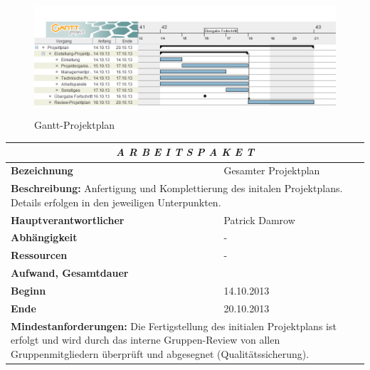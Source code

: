 \documentclass[fontsize=12pt,paper=a4,twoside]{scrartcl}
\begin{document}
\begin{figure}[htbp]
\caption{Gantt-Projektplan}
\includegraphics[scale=0.56]{Gantt-Projektplan.png}
\newline
\label{Gantt-Projektplan}
\end{figure}


\begin{tabular}{p{7.5cm}|p{7.5cm}}\toprule
\multicolumn{2}{c}{\textbf{\textit{A R B E I T S P A K E T \quad 1}}} \\ \toprule \hline
\textbf{Bezeichnung} & Gesamter Projektplan\\\hline
\multicolumn{2}{p{15cm}}{\textbf{Beschreibung:} \newline 
Anfertigung und Komplettierung des initalen Projektplans. Details erfolgen in den jeweiligen Unterpunkten.}  \\\hline
\textbf{Hauptverantwortlicher} & Patrick Damrow\\\hline
\textbf{Abhängigkeit} & -\\\hline
\textbf{Ressourcen} & -\\\hline
\textbf{Aufwand, Gesamtdauer} & \\\hline
\textbf{Beginn} & 14.10.2013 \\\hline
\textbf{Ende} & 20.10.2013\\\hline
\multicolumn{2}{p{15cm}}{\textbf{Mindestanforderungen: } \newline
Die Fertigstellung des initialen Projektplans ist erfolgt und wird durch das interne Gruppen-Review von allen Gruppenmitgliedern überprüft und abgesegnet (Qualitätssicherung).}  \\ \toprule
\end{tabular} \\\\
\end{document}
